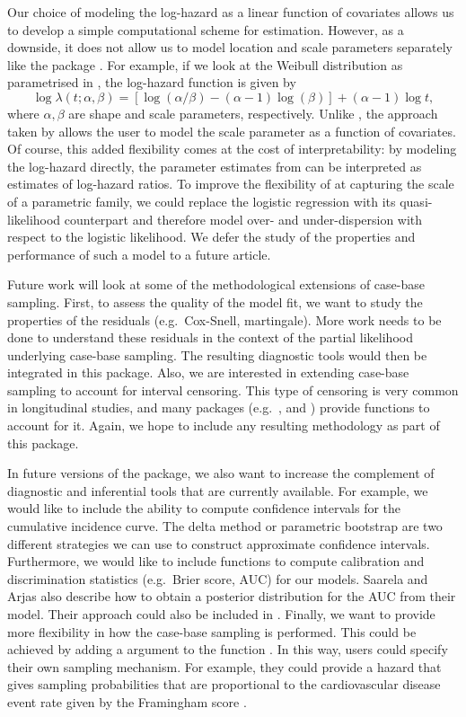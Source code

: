 \documentclass[
]{jss}
\begin{document}
Our choice of modeling the log-hazard as a linear function of covariates
allows us to develop a simple computational scheme for estimation.
However, as a downside, it does not allow us to model location and scale
parameters separately like the package . For example, if
we look at the Weibull distribution as parametrised in
, the log-hazard function is given by
\[ \log \lambda(t; \alpha, \beta) = \left[\log(\alpha/\beta) - (\alpha - 1)\log(\beta)\right] + (\alpha - 1)\log t,\]
where \(\alpha,\beta\) are shape and scale parameters, respectively.
Unlike , the approach taken by  allows the
user to model the scale parameter as a function of covariates. Of
course, this added flexibility comes at the cost of interpretability: by
modeling the log-hazard directly, the parameter estimates from
 can be interpreted as estimates of log-hazard ratios. To
improve the flexibility of  at capturing the scale of a
parametric family, we could replace the logistic regression with its
quasi-likelihood counterpart and therefore model over- and
under-dispersion with respect to the logistic likelihood. We defer the
study of the properties and performance of such a model to a future
article.

Future work will look at some of the methodological extensions of
case-base sampling. First, to assess the quality of the model fit, we
want to study the properties of the residuals (e.g.~Cox-Snell,
martingale). More work needs to be done to understand these residuals in
the context of the partial likelihood underlying case-base sampling. The
resulting diagnostic tools would then be integrated in this package.
Also, we are interested in extending case-base sampling to account for
interval censoring. This type of censoring is very common in
longitudinal studies, and many packages (e.g.~,
 and ) provide functions to account for it.
Again, we hope to include any resulting methodology as part of this
package.

In future versions of the package, we also want to increase the
complement of diagnostic and inferential tools that are currently
available. For example, we would like to include the ability to compute
confidence intervals for the cumulative incidence curve. The delta
method or parametric bootstrap are two different strategies we can use
to construct approximate confidence intervals. Furthermore, we would
like to include functions to compute calibration and discrimination
statistics (e.g.~Brier score, AUC) for our models. Saarela and Arjas
\citeyearpar{saarela2015non} also describe how to obtain a posterior
distribution for the AUC from their model. Their approach could also be
included in . Finally, we want to provide more flexibility
in how the case-base sampling is performed. This could be achieved by
adding a  argument to the function .
In this way, users could specify their own sampling mechanism. For
example, they could provide a hazard that gives sampling probabilities
that are proportional to the cardiovascular disease event rate given by
the Framingham score \citep{saarela2015non}.
\end{document}

